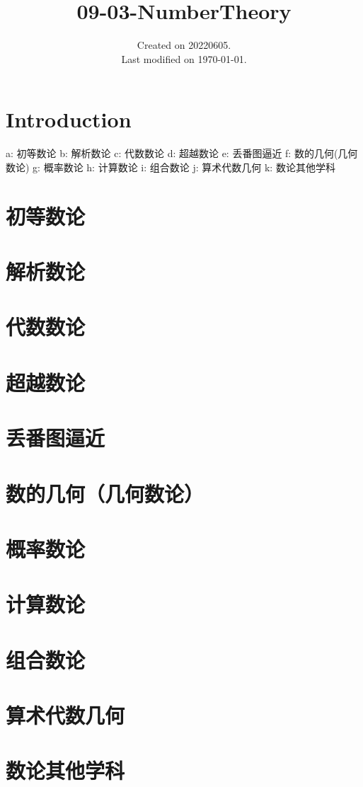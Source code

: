 \documentclass[UTF8]{../09-Mathematics}
\begin{document}
\title{09-03-NumberTheory}
\date{Created on 20220605.\\   Last modified on \today.}
\maketitle
\tableofcontents


\chapter{Introduction}



a: 初等数论
b: 解析数论
c: 代数数论
d: 超越数论
e: 丢番图逼近
f: 数的几何(几何数论)
g: 概率数论
h: 计算数论
i: 组合数论
j: 算术代数几何
k: 数论其他学科

\chapter{初等数论}
\chapter{解析数论}
\chapter{代数数论}
\chapter{超越数论}
\chapter{丢番图逼近}
\chapter{数的几何（几何数论）}
\chapter{概率数论}
\chapter{计算数论}
\chapter{组合数论}
\chapter{算术代数几何}
\chapter{数论其他学科}
\end{document}
